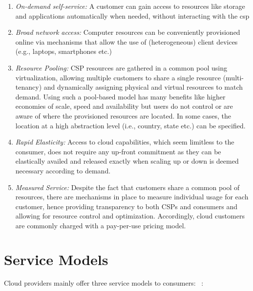\begin{enumerate} 
    \item \textit{On-demand self-service:} A customer can gain access to resources like storage and applications automatically when needed, without interacting with the \ac{csp}

    \item \textit{Broad network access:} Computer resources can be conveniently provisioned online via mechanisms that allow the use of (heterogeneous) client devices (e.g., laptops, smartphones etc.)

    \item \textit{Resource Pooling:} CSP resources are gathered in a common pool using virtualization, allowing multiple customers to share a single resource (multi-tenancy) and dynamically assigning physical and virtual resources to match demand. Using such a pool-based model has many benefits like higher economies of scale, speed and availability but users do not control or are aware of where the provisioned resources are located. In some cases, the location at a high abstraction level (i.e., country, state etc.) can be specified.

    \item \textit{Rapid Elasticity:} Access to cloud capabilities, which seem limitless to the consumer, does not require any up-front commitment as they can be elastically availed and released exactly when scaling up or down is deemed necessary according to demand.

    \item \textit{Measured Service:} Despite the fact that customers share a common pool of resources, there are mechanisms in place to measure individual usage for each customer, hence providing transparency to both CSPs and consumers and allowing for resource control and optimization. Accordingly, cloud customers are commonly charged with a pay-per-use pricing model.
\end{enumerate}


\section{Service Models}
Cloud providers mainly offer three service models to consumers: ~\cite{nist,c2,c1}:

